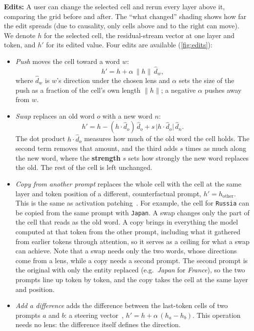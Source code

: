 \documentclass{vgtc}       %
\begin{document}
\textbf{Edits:} A user can change the selected cell and rerun every layer above it, comparing the grid before and
after. The ``what changed'' shading shows how far the edit spreads (due to causality, only cells above and to the right can move). We denote
$h$ for the selected cell, the residual-stream vector at one layer and token, and $h'$ for its edited value. Four edits
are available (\cref{fig:edits}):
\begin{itemize}
    \item \emph{Push} moves the cell toward a word $w$:
\begin{equation}
  h' = h + \alpha\,\lVert h\rVert\,\hat d_w ,
\end{equation}
where $\hat d_w$ is $w$'s direction under the chosen lens and $\alpha$ sets the size of the
push as a fraction of the cell's own length $\lVert h\rVert$; a negative $\alpha$ pushes away from $w$.

\item \emph{Swap} replaces an old word $o$ with a new word $n$:
\begin{equation}
  h' = h - (h\cdot\hat d_o)\,\hat d_o + s\,\lvert h\cdot\hat d_o\rvert\,\hat d_n .
\end{equation}
The dot product $h\cdot\hat d_o$ measures how much of the old word the cell holds. The second term removes that
amount, and the third adds $s$ times as much along the new word, where the \textbf{strength} $s$ sets how strongly the new word
replaces the old. The rest of the cell is left unchanged.

\item \emph{Copy from another prompt} replaces the whole cell with the cell at the same layer and token position of a different,
counterfactual prompt, $h' = h_{\text{other}}$. This is the same as activation patching~\cite{meng2022rome, zhang2024patching, heimersheim2024patching}. For example, the cell for
\texttt{Russia} can be copied from the same prompt with \texttt{Japan}. A swap changes only the part of the cell that
reads as the old word. A copy brings in everything the model computed at that token from the other prompt, including
what it gathered from earlier tokens through attention, so it serves as a ceiling for what a swap can achieve. Note that a swap needs only the two words, whose directions come from a lens, while a copy needs a second prompt. The second prompt is the original with only the entity replaced (e.g.\ \emph{Japan} for \emph{France}), so the two
prompts line up token by token, and the copy takes the cell at the same layer and position.


\item \emph{Add a difference} adds the difference between the last-token cells of two prompts $a$ and $b$: a steering
vector~\cite{turner2023actadd}, $h' = h + \alpha\,(h_a - h_b)$. This operation needs no lens: the difference itself defines the direction.

\end{itemize}
\end{document}
